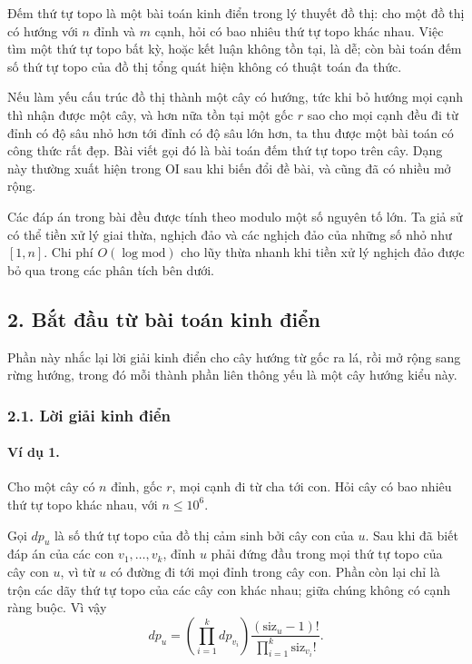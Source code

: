 \documentclass[11pt]{article}
\begin{document}
Đếm thứ tự topo là một bài toán kinh điển trong lý thuyết đồ thị: cho một đồ
thị có hướng với \(n\) đỉnh và \(m\) cạnh, hỏi có bao nhiêu thứ tự topo khác
nhau. Việc tìm một thứ tự topo bất kỳ, hoặc kết luận không tồn tại, là dễ; còn
bài toán đếm số thứ tự topo của đồ thị tổng quát hiện không có thuật toán đa
thức.

Nếu làm yếu cấu trúc đồ thị thành một cây có hướng, tức khi bỏ hướng mọi cạnh
thì nhận được một cây, và hơn nữa tồn tại một gốc \(r\) sao cho mọi cạnh đều đi
từ đỉnh có độ sâu nhỏ hơn tới đỉnh có độ sâu lớn hơn, ta thu được một bài toán
có công thức rất đẹp. Bài viết gọi đó là bài toán đếm thứ tự topo trên cây. Dạng
này thường xuất hiện trong OI sau khi biến đổi đề bài, và cũng đã có nhiều mở
rộng.

Các đáp án trong bài đều được tính theo modulo một số nguyên tố lớn. Ta giả sử
có thể tiền xử lý giai thừa, nghịch đảo và các nghịch đảo của những số nhỏ như
\([1,n]\). Chi phí \(O(\log \mathrm{mod})\) cho lũy thừa nhanh khi tiền xử lý
nghịch đảo được bỏ qua trong các phân tích bên dưới.

\subsection*{2. Bắt đầu từ bài toán kinh điển}

Phần này nhắc lại lời giải kinh điển cho cây hướng từ gốc ra lá, rồi mở rộng
sang rừng hướng, trong đó mỗi thành phần liên thông yếu là một cây hướng kiểu
này.

\subsubsection*{2.1. Lời giải kinh điển}

\paragraph{Ví dụ 1.}
Cho một cây có \(n\) đỉnh, gốc \(r\), mọi cạnh đi từ cha tới con. Hỏi cây có bao
nhiêu thứ tự topo khác nhau, với \(n\le 10^6\).


Gọi \(dp_u\) là số thứ tự topo của đồ thị cảm sinh bởi cây con của \(u\). Sau
khi đã biết đáp án của các con \(v_1,\ldots,v_k\), đỉnh \(u\) phải đứng đầu
trong mọi thứ tự topo của cây con \(u\), vì từ \(u\) có đường đi tới mọi đỉnh
trong cây con. Phần còn lại chỉ là trộn các dãy thứ tự topo của các cây con
khác nhau; giữa chúng không có cạnh ràng buộc. Vì vậy
\[
  dp_u =
  \left(\prod_{i=1}^k dp_{v_i}\right)
  \frac{(\mathrm{siz}_u-1)!}{\prod_{i=1}^k \mathrm{siz}_{v_i}!}.
\]
\end{document}
